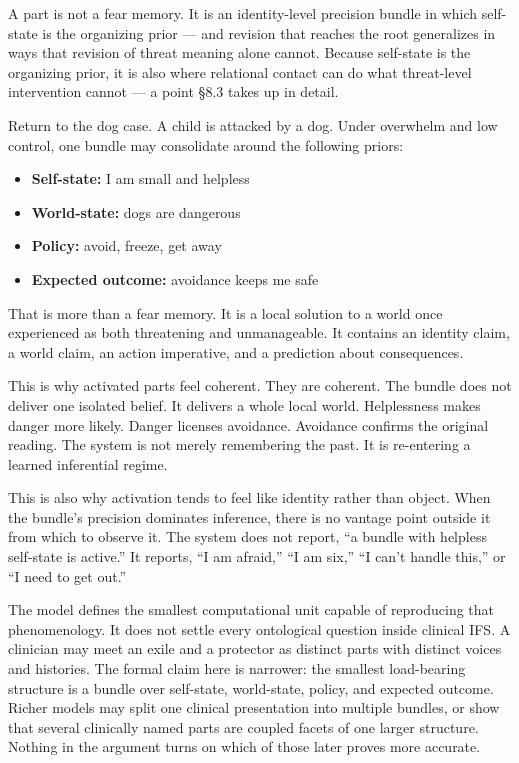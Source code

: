 \documentclass[12pt,a4paper]{article}
\providecommand{\tightlist}{%
  \setlength{\itemsep}{0pt}\setlength{\parskip}{0pt}}
\begin{document}
A part is not a fear memory. It is an identity-level precision bundle in
which self-state is the organizing prior --- and revision that reaches
the root generalizes in ways that revision of threat meaning alone
cannot. Because self-state is the organizing prior, it is also where
relational contact can do what threat-level intervention cannot --- a
point §8.3 takes up in detail.

Return to the dog case. A child is attacked by a dog. Under overwhelm
and low control, one bundle may consolidate around the following priors:

\begin{itemize}
\tightlist
\item
  \textbf{Self-state:} I am small and helpless
\item
  \textbf{World-state:} dogs are dangerous
\item
  \textbf{Policy:} avoid, freeze, get away
\item
  \textbf{Expected outcome:} avoidance keeps me safe
\end{itemize}

That is more than a fear memory. It is a local solution to a world once
experienced as both threatening and unmanageable. It contains an
identity claim, a world claim, an action imperative, and a prediction
about consequences.

This is why activated parts feel coherent. They are coherent. The bundle
does not deliver one isolated belief. It delivers a whole local world.
Helplessness makes danger more likely. Danger licenses avoidance.
Avoidance confirms the original reading. The system is not merely
remembering the past. It is re-entering a learned inferential regime.

This is also why activation tends to feel like identity rather than
object. When the bundle's precision dominates inference, there is no
vantage point outside it from which to observe it. The system does not
report, ``a bundle with helpless self-state is active.'' It reports, ``I
am afraid,'' ``I am six,'' ``I can't handle this,'' or ``I need to get
out.''

The model defines the smallest computational unit capable of reproducing
that phenomenology. It does not settle every ontological question inside
clinical IFS. A clinician may meet an exile and a protector as distinct
parts with distinct voices and histories. The formal claim here is
narrower: the smallest load-bearing structure is a bundle over
self-state, world-state, policy, and expected outcome. Richer models may
split one clinical presentation into multiple bundles, or show that
several clinically named parts are coupled facets of one larger
structure. Nothing in the argument turns on which of those later proves
more accurate.
\end{document}
